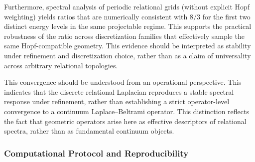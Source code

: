     Furthermore, spectral analysis of periodic relational grids (without explicit Hopf weighting) yields ratios that are
    numerically consistent with $8/3$ for the first two distinct energy levels in the same projectable regime.
    This supports the practical robustness of the ratio across discretization families that effectively sample the same
    Hopf-compatible geometry.
    This evidence should be interpreted as stability under refinement and discretization choice, rather than as a claim
    of universality across arbitrary relational topologies.

    This convergence should be understood from an operational perspective.
    This indicates that the discrete relational Laplacian reproduces a stable spectral response under refinement, rather
    than establishing a strict operator-level convergence to a continuum Laplace--Beltrami operator.
    This distinction reflects the fact that geometric operators arise here as effective descriptors of relational
    spectra, rather than as fundamental continuum objects.

  \subsubsection*{Computational Protocol and Reproducibility}
    \label{subsec:computational_protocol}

